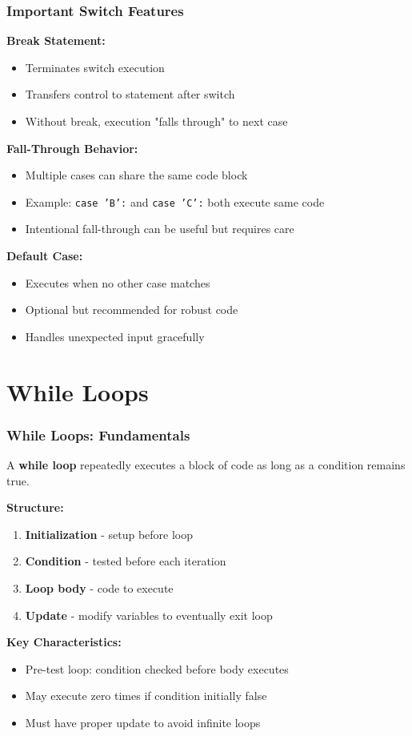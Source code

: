 \documentclass{beamer}
\begin{document}
\begin{frame}
\frametitle{Important Switch Features}
\textbf{Break Statement:}
\begin{itemize}
\item Terminates switch execution
\pause
\item Transfers control to statement after switch
\pause
\item Without break, execution "falls through" to next case
\end{itemize}

\pause
\textbf{Fall-Through Behavior:}
\begin{itemize}
\item Multiple cases can share the same code block
\pause
\item Example: \texttt{case 'B':} and \texttt{case 'C':} both execute same code
\pause
\item Intentional fall-through can be useful but requires care
\end{itemize}

\pause
\textbf{Default Case:}
\begin{itemize}
\item Executes when no other case matches
\pause
\item Optional but recommended for robust code
\pause
\item Handles unexpected input gracefully
\end{itemize}
\end{frame}

\section{While Loops}

\begin{frame}
\frametitle{While Loops: Fundamentals}
A \textbf{while loop} repeatedly executes a block of code as long as a condition remains true.

\textbf{Structure:}
\begin{enumerate}
\item \textbf{Initialization} - setup before loop
\pause
\item \textbf{Condition} - tested before each iteration
\pause
\item \textbf{Loop body} - code to execute
\pause
\item \textbf{Update} - modify variables to eventually exit loop
\end{enumerate}

\textbf{Key Characteristics:}
\begin{itemize}
\item Pre-test loop: condition checked before body executes
\pause
\item May execute zero times if condition initially false
\pause
\item Must have proper update to avoid infinite loops
\end{itemize}
\end{frame}
\end{document}
